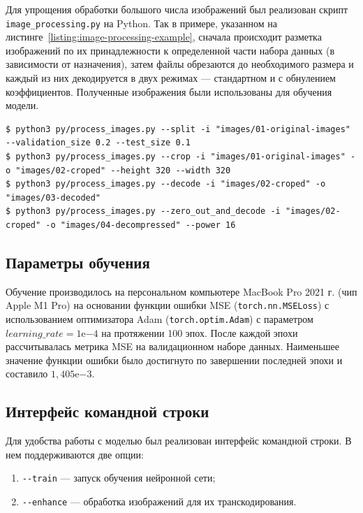 \documentclass[times,specification,annotation]{itmo-student-thesis}
\begin{document}
Для упрощения обработки большого числа изображений был реализован скрипт \texttt{image\_processing.py} на Python. Так в примере, указанном на листинге~\ref{listing:image-processing-example}, сначала происходит разметка изображений по их принадлежности к определенной части набора данных (в зависимости от назначения), затем файлы обрезаются до необходимого размера и каждый из них декодируется в двух режимах --- стандартном и с обнулением коэффициентов. Полученные изображения были использованы для обучения модели.

\begin{lstlisting}[float=!h,caption={Подготовка набора данных для обучения модели},label={listing:image-processing-example}]
$ python3 py/process_images.py --split -i "images/01-original-images" --validation_size 0.2 --test_size 0.1
$ python3 py/process_images.py --crop -i "images/01-original-images" -o "images/02-croped" --height 320 --width 320
$ python3 py/process_images.py --decode -i "images/02-croped" -o "images/03-decoded"
$ python3 py/process_images.py --zero_out_and_decode -i "images/02-croped" -o "images/04-decompressed" --power 16
\end{lstlisting}

\subsection{Параметры обучения}\label{subsection:learning-parameters}

Обучение производилось на персональном компьютере MacBook Pro 2021 г. (чип Apple M1 Pro) на основании функции ошибки MSE (\texttt{torch.nn.MSELoss}) с использованием оптимизатора Adam (\texttt{torch.optim.Adam}) с параметром $learning\_rate=1\mathrm{e}{-4}$ на протяжении 100 эпох. После каждой эпохи рассчитывалась метрика MSE на валидационном наборе данных. Наименьшее значение функции ошибки было достигнуто по завершении последней эпохи и составило $1,405\mathrm{e}{-3}$.\par

\subsection{Интерфейс командной строки}\label{subsection:model-cli}

Для удобства работы с моделью был реализован интерфейс командной строки. В нем поддерживаются две опции:
\begin{enumerate}
    \item \verb|--train| --- запуск обучения нейронной сети;
    \item \verb|--enhance| --- обработка изображений для их транскодирования.
\end{enumerate}
\end{document}
